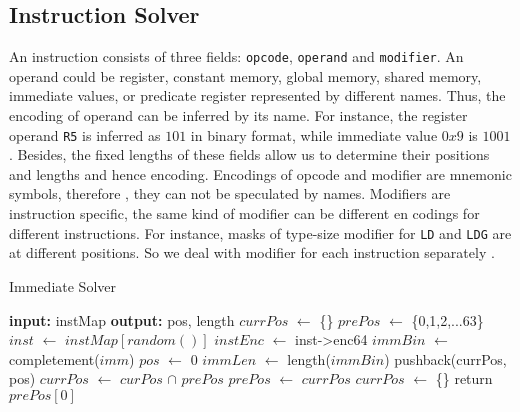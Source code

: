 \subsection{Instruction Solver}


An instruction consists of three fields: {\tt opcode}, {\tt operand} and {\tt modifier}. An operand could be register, 
constant memory, global memory, shared memory, immediate values, or predicate register represented by different names.
Thus, the encoding of operand can be inferred by its name. For instance, the register operand {\tt R5} is
inferred as $101$ in binary format, while immediate value $0x9$ is $1001$. Besides, the fixed lengths of these fields allow us to determine their positions and lengths and hence encoding. 
Encodings of opcode and modifier are mnemonic symbols, therefore
, they can not be speculated by names. Modifiers are instruction specific, the same kind of modifier can be different en
codings for different instructions. For instance, masks of type-size
modifier for {\tt LD} and {\tt LDG} are at different positions. So we deal with modifier for each instruction separately
. 



\begin{algorithm}
      \caption{Immediate Solver}
      \label{algo:int_solver}
  \begin{algorithmic}[1]
	  \State \textbf{input:} instMap
      \State \textbf{output:} pos, length
      \State $currPos$ $\gets$ \{\}
      \State $prePos$ $\gets$ \{0,1,2,...63\}
      \State $inst$ $\gets$ $instMap[random()]$
      \State $instEnc$ $\gets$ inst->enc64
      \State $immBin$ $\gets$ completement($imm$)
      \State $pos$ $\gets$ 0
      \State $immLen$ $\gets$ length($immBin$)
      \State pushback(currPos, pos)
      \EndIf
      \EndWhile
      \State $currPos$ $\gets$ $curPos$ $\cap$ $prePos$
      \State $prePos$ $\gets$ $currPos$
      \State $currPos$ $\gets$ \{\}
      \EndIf
      \EndWhile
      \State return $prePos[0]$
  \end{algorithmic}
\end{algorithm}

